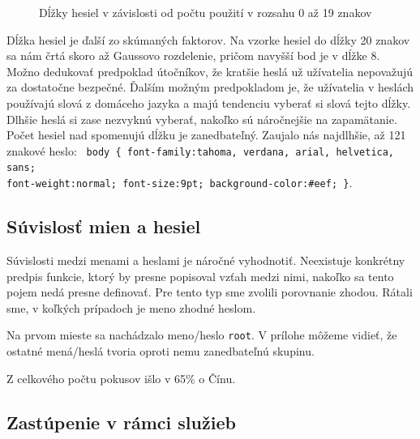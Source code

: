 \documentclass[12pt, oneside]{book}
\begin{document}
\begin{figure}[h]
\caption{Dĺžky hesiel v závislosti od počtu použití v rozsahu 0 až 19 znakov}
\end{figure}

Dĺžka hesiel je ďalší zo skúmaných faktorov.
Na vzorke hesiel do dĺžky 20 znakov sa nám črtá skoro až Gaussovo rozdelenie, pričom navyšší bod je v dĺžke 8.
Možno dedukovať predpoklad útočníkov, že kratšie heslá už užívatelia nepovažujú za dostatočne bezpečné.
Ďalším možným predpokladom je, že užívatelia v heslách používajú slová z domáceho jazyka a majú tendenciu vyberať si slová tejto dĺžky.
Dlhšie heslá si zase nezvyknú vyberať, nakoľko sú náročnejšie na zapamätanie.
Počet hesiel nad spomenujú dĺžku je zanedbateľný.
Zaujalo nás najdlhšie, až 121 znakové heslo:
\texttt{ body \{ font-family:tahoma, verdana, arial, helvetica, sans; \\font-weight:normal; font-size:9pt; background-color:\#eef; \}}.


\subsection{Súvislosť mien a hesiel}

Súvislosti medzi menami a heslami je náročné vyhodnotiť.
Neexistuje konkrétny predpis funkcie, ktorý by presne popisoval vzťah medzi nimi, nakoľko sa tento pojem nedá presne definovať.
Pre tento typ sme zvolili porovnanie zhodou.
Rátali sme, v koľkých prípadoch je meno zhodné heslom.

Na prvom mieste sa nachádzalo meno/heslo \texttt{root}.
V prílohe môžeme vidieť, že ostatné mená/heslá tvoria oproti nemu zanedbateľnú skupinu. 

Z celkového počtu pokusov išlo v 65\% o Čínu.

\subsection{Zastúpenie v rámci služieb}
\end{document}
